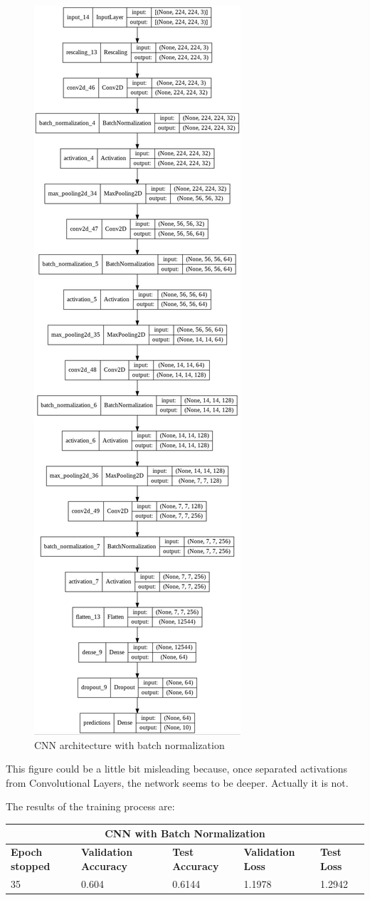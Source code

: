 \begin{figure}[H]
	\centering
	\includegraphics[height=1.4\textwidth]{img/scratch/batch_normalization.jpg}
	\caption{CNN architecture with batch normalization}
	\label{fig: BatchNormalizationCNN}
\end{figure}

\noindent This figure could be a little bit misleading because, once separated activations from Convolutional Layers, the network seems to be deeper. Actually it is not.

\noindent The results of the training process are: 

\medskip

\begin{tabular}{ |p{2cm}|p{2cm}|p{2cm}|p{2cm}|p{2cm}|  }
\hline
\multicolumn{5}{|c|}{CNN with Batch Normalization} \\
\hline
\textbf{Epoch stopped} & \textbf{Validation Accuracy} & \textbf{Test Accuracy} & \textbf{Validation Loss} & \textbf{Test Loss} \\
\hline
35 & 0.604 & 0.6144 & 1.1978 & 1.2942\\
\hline
\end{tabular}

